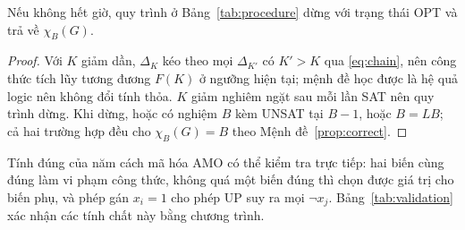 \begin{proposition}\label{prop:exact}
Nếu không hết giờ, quy trình ở Bảng~\ref{tab:procedure} dừng với trạng thái OPT và trả về $\chi_B(G)$.
\end{proposition}
\begin{proof}
Với $K$ giảm dần, $\Delta_K$ kéo theo mọi $\Delta_{K'}$ có $K'>K$ qua \eqref{eq:chain}, nên công thức tích lũy tương đương $F(K)$ ở ngưỡng hiện tại; mệnh đề học được là hệ quả logic nên không đổi tính thỏa. $K$ giảm nghiêm ngặt sau mỗi lần SAT nên quy trình dừng. Khi dừng, hoặc có nghiệm $B$ kèm UNSAT tại $B-1$, hoặc $B=LB$; cả hai trường hợp đều cho $\chi_B(G)=B$ theo Mệnh đề~\ref{prop:correct}.
\end{proof}

Tính đúng của năm cách mã hóa AMO có thể kiểm tra trực tiếp: hai biến cùng đúng làm vi phạm công thức, không quá một biến đúng thì chọn được giá trị cho biến phụ, và phép gán $x_i=1$ cho phép UP suy ra mọi $\neg x_j$. Bảng~\ref{tab:validation} xác nhận các tính chất này bằng chương trình.
